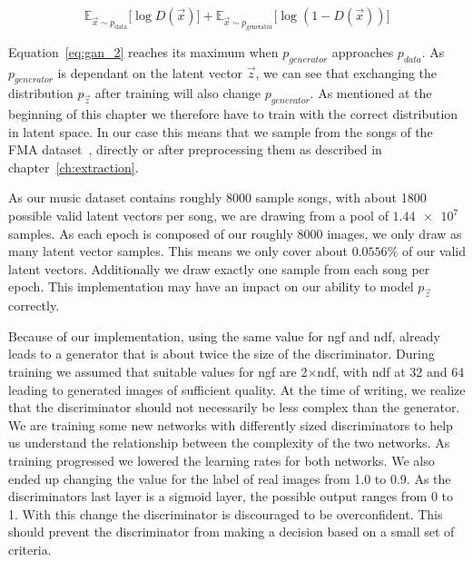             \begin{equation}
                \mathbb{E}_{\vec{x} \sim p_{\text{data}}}
                    \bigl[ \log D(\vec{x}) \bigr] +
                \mathbb{E}_{\vec{x} \sim p_{\text{generator}}}
                    \bigl[ \log \left( 1 - D(\vec{x}) \right) \bigr]
                \label{eq:gan_2}
            \end{equation}

            Equation~\ref{eq:gan_2} reaches its maximum when $p_{generator}$ approaches $p_{data}$. As $p_{generator}$ is dependant on the latent vector $\vec{z}$, we can see that exchanging the distribution $p_{\vec{z}}$ after training will also change $p_{generator}$. As mentioned at the beginning of this chapter we therefore have to train with the correct distribution in latent space. In our case this means that we sample from the songs of the FMA dataset~\cite{FMA}, directly or after preprocessing them as described in chapter~\ref{ch:extraction}.

            As our music dataset contains roughly 8000 sample songs, with about 1800 possible valid latent vectors per song, we are drawing from a pool of $\num{1.44e7}$ samples. As each epoch is composed of our roughly 8000 images, we only draw as many latent vector samples. This means we only cover about $0.0556\%$ of our valid latent vectors. Additionally we draw exactly one sample from each song per epoch. This implementation may have an impact on our ability to model $p_{\vec{z}}$ correctly.

            Because of our implementation, using the same value for ngf and ndf, already leads to a generator that is about twice the size of the discriminator. During training we assumed that suitable values for ngf are 2$\times$ndf, with ndf at 32 and 64 leading to generated images of sufficient quality. At the time of writing, we realize that the discriminator should not necessarily be less complex than the generator. We are training some new networks with differently sized discriminators to help us understand the relationship between the complexity of the two networks. As training progressed we lowered the learning rates for both networks. We also ended up changing the value for the label of real images from 1.0 to 0.9. As the discriminators last layer is a sigmoid layer, the possible output ranges from 0 to 1. With this change the discriminator is discouraged to be overconfident. This should prevent the discriminator from making a decision based on a small set of criteria.


